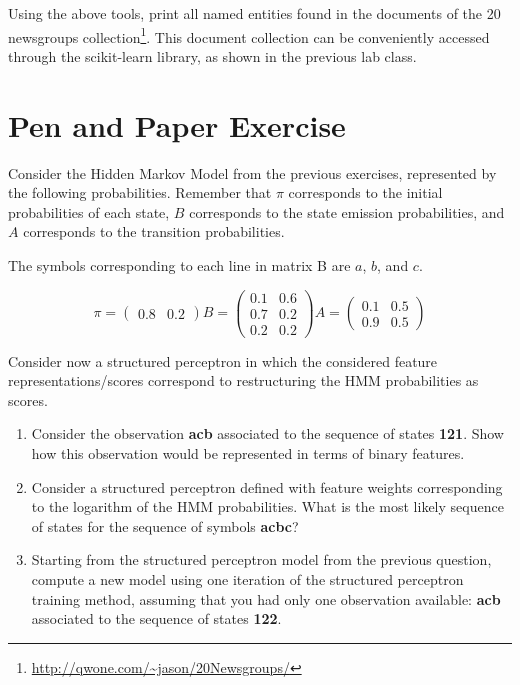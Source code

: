 \documentclass[12pt]{article}
\begin{document}
Using the above tools, print all named entities found in the documents of the 20 newsgroups collection\footnote{ \url{http://qwone.com/~jason/20Newsgroups/}}. This document collection can be conveniently accessed through the scikit-learn library, as shown in the previous lab class.

\section{Pen and Paper Exercise}

Consider the Hidden Markov Model from the previous exercises, represented by the following probabilities. Remember that $\pi$ corresponds to the initial probabilities of each state, $B$ corresponds to the state emission probabilities, and $A$ corresponds to the transition probabilities. 

The symbols corresponding to each line in matrix B are $a$, $b$, and $c$.

\begin{displaymath}
    \pi = 
    \begin{pmatrix}
        0.8 & 0.2
    \end{pmatrix}
    B = 
    \begin{pmatrix}
        0.1 & 0.6 \\
        0.7 & 0.2 \\
        0.2 & 0.2 
    \end{pmatrix}
    A = 
    \begin{pmatrix}
        0.1 & 0.5 \\
        0.9 & 0.5
    \end{pmatrix}
\end{displaymath}

Consider now a structured perceptron in which the considered feature representations/scores correspond to restructuring the HMM probabilities as scores.

\begin{enumerate}
\item Consider the observation \textbf{acb} associated to the sequence of states {\bf 121}. Show how this observation would be represented in terms of binary features.

\item Consider a structured perceptron defined with feature weights corresponding to the logarithm of the HMM probabilities. What is the most likely sequence of states for the sequence of symbols {\bf acbc}?

\item Starting from the structured perceptron model from the previous question, compute a new model using one iteration of the structured perceptron training method, assuming that you had only one observation available: \textbf{acb} associated to the sequence of states {\bf 122}.
\end{enumerate}
\end{document}
